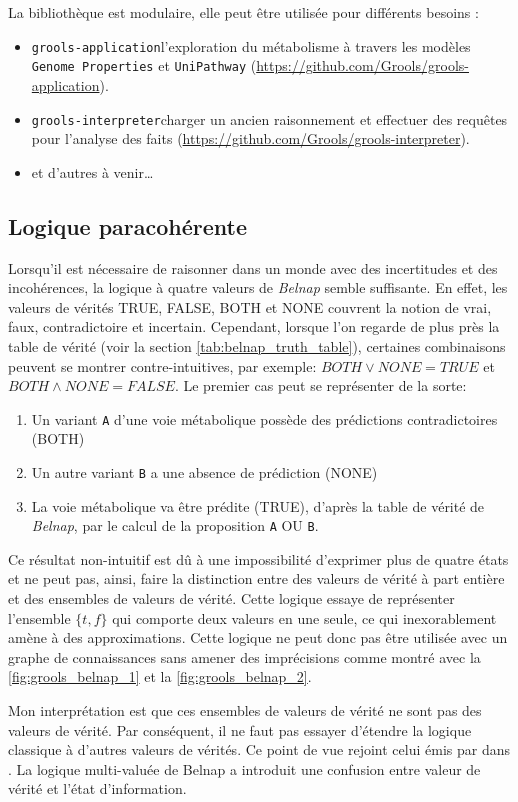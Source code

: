 \begin{refsegment}
La bibliothèque est modulaire, elle peut être utilisée pour différents besoins :\nolisttopbreak
\begin{itemize}
	\item \texttt{grools-application}l'exploration du métabolisme à travers les modèles \texttt{Genome Properties} et \texttt{UniPathway}  (\url{https://github.com/Grools/grools-application}).
	\item \texttt{grools-interpreter}charger un ancien raisonnement et effectuer des requêtes pour l'analyse des faits (\url{https://github.com/Grools/grools-interpreter}).
	\item et d'autres à venir\ldots
\end{itemize}

\subsection{Logique paracohérente}
Lorsqu'il est nécessaire de raisonner dans un monde avec des incertitudes et des incohérences, la logique à quatre valeurs de \textit{Belnap} semble suffisante. En effet, les valeurs de vérités TRUE, FALSE, BOTH et NONE couvrent la notion de vrai, faux, contradictoire et incertain. Cependant, lorsque l'on regarde de plus près la table de vérité  (voir la section   \cref{tab:belnap_truth_table}), certaines combinaisons peuvent se montrer contre-intuitives, par exemple: $ BOTH \lor  NONE = TRUE$ et $ BOTH \land NONE = FALSE$. Le premier cas  peut se représenter de la sorte: 
\begin{enumerate}
    \item Un variant \texttt{A} d'une voie métabolique possède des prédictions contradictoires (BOTH)
    \item Un autre variant \texttt{B} a une absence de prédiction (NONE)
    \item La voie métabolique va être prédite (TRUE), d'après la table de vérité de \textit{Belnap}, par le calcul de la proposition \texttt{A} OU \texttt{B}.
\end{enumerate}
Ce résultat non-intuitif est dû à une impossibilité d'exprimer plus de quatre états et ne peut pas, ainsi, faire la distinction entre des valeurs de vérité à part entière et des ensembles de valeurs de vérité. Cette logique essaye de représenter l'ensemble $\{t,f\}$ qui comporte deux valeurs en une seule, ce qui inexorablement amène à des approximations. Cette logique ne peut donc pas être utilisée avec un graphe de connaissances sans amener des  imprécisions comme montré avec la \cref{fig:grools_belnap_1} et la  \cref{fig:grools_belnap_2}. 

Mon interprétation est que ces ensembles de valeurs de vérité ne sont pas des valeurs de vérité. Par conséquent, il ne faut pas essayer d'étendre la logique classique à d'autres valeurs de vérités. Ce point de vue rejoint celui émis par \citeauthor{dubois2008ignorance} dans \cite{dubois2008ignorance}. La logique multi-valuée de Belnap a introduit une confusion entre valeur de vérité et l'état d'information.


\end{refsegment}
